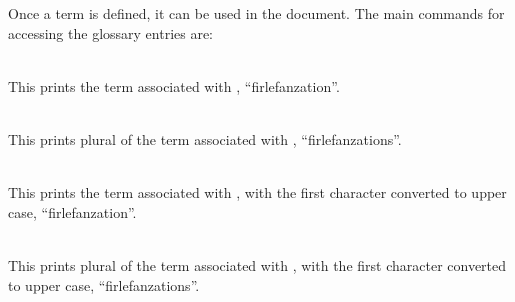 Once a term is defined, it can be used in the document. The main commands
for accessing the glossary entries are:

\begin{description}
   \item {} \\
      This prints the term associated with ,
      \EG{} ``\gls{firlefanzation}''.
   \item {} \\
      This prints plural of the term associated with ,
      \EG{} ``\glspl{firlefanzation}''.
   \item {} \\
      This prints the term associated with , with the first character
      converted to upper case, \EG{} ``\Gls{firlefanzation}''.
   \item {} \\
      This prints plural of the term associated with , with the first
      character converted to upper case, \EG{} ``\Glspl{firlefanzation}''.
\end{description}
